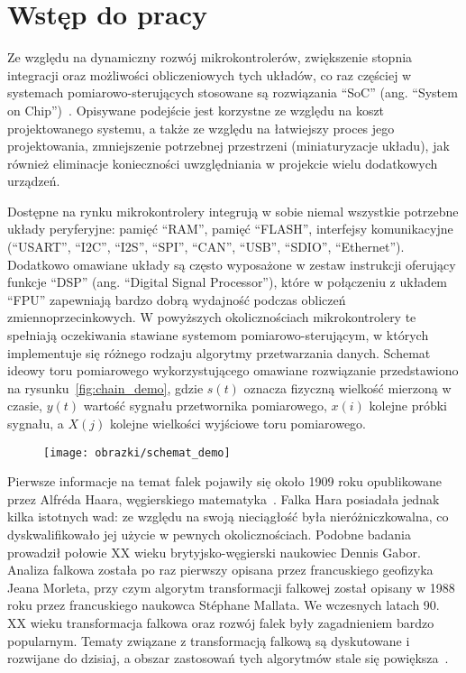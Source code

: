 \chapter{Wstęp do pracy}

Ze względu na dynamiczny rozwój mikrokontrolerów, zwiększenie stopnia integracji oraz możliwości obliczeniowych tych układów, co raz częściej w systemach pomiarowo-sterujących stosowane są rozwiązania \enquote{SoC} (ang. \enquote{System on Chip})~\cite{saleh_systemonchip}. Opisywane podejście jest korzystne ze względu na koszt projektowanego systemu, a także ze względu na łatwiejszy proces jego projektowania, zmniejszenie potrzebnej przestrzeni (miniaturyzacje układu), jak również eliminacje konieczności uwzględniania w projekcie wielu dodatkowych urządzeń.

Dostępne na rynku mikrokontrolery integrują w sobie niemal wszystkie potrzebne układy peryferyjne: pamięć \enquote{RAM}, pamięć \enquote{FLASH}, interfejsy komunikacyjne (\enquote{USART}, \enquote{I2C}, \enquote{I2S}, \enquote{SPI}, \enquote{CAN}, \enquote{USB}, \enquote{SDIO}, \enquote{Ethernet}). Dodatkowo omawiane układy są często wyposażone w zestaw instrukcji oferujący funkcje \enquote{DSP} (ang. \enquote{Digital Signal Processor}), które w połączeniu z układem \enquote{FPU} zapewniają bardzo dobrą wydajność podczas obliczeń zmiennoprzecinkowych. W powyższych okolicznościach mikrokontrolery te spełniają oczekiwania stawiane systemom pomiarowo-sterującym, w których implementuje się różnego rodzaju algorytmy przetwarzania danych. Schemat ideowy toru pomiarowego wykorzystującego omawiane rozwiązanie przedstawiono na rysunku~\ref{fig:chain_demo}, gdzie $s(t)$ oznacza fizyczną wielkość mierzoną w czasie, $y(t)$ wartość sygnału przetwornika pomiarowego, $x(i)$ kolejne próbki sygnału, a $X(j)$ kolejne wielkości wyjściowe toru pomiarowego.

\begin{figure}[htb!]
\begin{center}
\texttt{[image: obrazki/schemat\_demo]}
\end{center}
\end{figure}

Pierwsze informacje na temat falek pojawiły się około 1909 roku opublikowane przez Alfréda Haara, węgierskiego matematyka~\cite{haar_basics}. Falka Hara posiadała jednak kilka istotnych wad: ze względu na swoją nieciągłość była nieróżniczkowalna, co dyskwalifikowało jej użycie w pewnych okolicznościach. Podobne badania prowadził połowie XX wieku brytyjsko-węgierski naukowiec Dennis Gabor. Analiza falkowa została po raz pierwszy opisana przez francuskiego geofizyka Jeana Morleta, przy czym algorytm transformacji falkowej został opisany w 1988 roku przez francuskiego naukowca Stéphane Mallata. We wczesnych latach 90. XX wieku transformacja falkowa oraz rozwój falek były zagadnieniem bardzo popularnym. Tematy związane z transformacją falkową są dyskutowane i rozwijane do dzisiaj, a obszar zastosowań tych algorytmów stale się powiększa~\cite{akujuobi_applications}.

